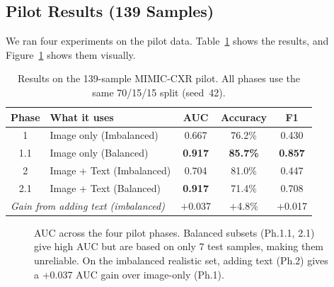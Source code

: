 \documentclass{article}
\begin{document}
\subsection{Pilot Results (139 Samples)}

We ran four experiments on the pilot data. Table~\ref{tab:pilot} shows
the results, and Figure~\ref{fig:auc_comparison} shows them visually.

\begin{table}[h]
\centering\small
\caption{Results on the 139-sample MIMIC-CXR pilot. All phases use the
same 70/15/15 split (seed~42).}
\label{tab:pilot}
\begin{tabular}{clccc}
\toprule
\textbf{Phase} & \textbf{What it uses} & \textbf{AUC} & \textbf{Accuracy} & \textbf{F1}\\
\midrule
1   & Image only (Imbalanced) & 0.667 & 76.2\% & 0.430 \\
1.1 & Image only (Balanced)  & \textbf{0.917} & \textbf{85.7\%} & \textbf{0.857} \\
2   & Image + Text (Imbalanced) & 0.704 & 81.0\% & 0.447 \\
2.1 & Image + Text (Balanced)  & \textbf{0.917} & 71.4\% & 0.708 \\
\midrule
\multicolumn{2}{l}{\textit{Gain from adding text (imbalanced)}}
  & $+$0.037 & $+$4.8\% & $+$0.017 \\
\bottomrule
\end{tabular}
\end{table}

\begin{figure}[h]
\centering
{}
\caption{AUC across the four pilot phases. Balanced subsets (Ph.1.1, 2.1)
give high AUC but are based on only 7 test samples, making them unreliable.
On the imbalanced realistic set, adding text (Ph.2) gives a +0.037 AUC gain
over image-only (Ph.1).}
\label{fig:auc_comparison}
\end{figure}
\end{document}
